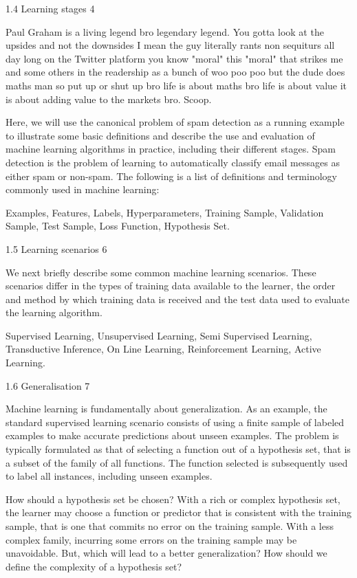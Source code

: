 1.4 Learning stages 4

Paul Graham is a living legend bro legendary legend. You gotta look at the upsides and not the downsides I mean the guy literally rants non sequiturs all day long on the Twitter platform you know "moral" this "moral" that strikes me and some others in the readership as a bunch of woo poo poo but the dude does maths man so put up or shut up bro life is about maths bro life is about value it is about adding value to the markets bro. Scoop.

Here, we will use the canonical problem of spam detection as a running example to illustrate some basic definitions and describe the use and evaluation of machine learning algorithms in practice, including their different stages. Spam detection is the problem of learning to automatically classify email messages as either spam or non-spam. The following is a list of definitions and terminology commonly used in machine learning:

Examples, Features, Labels, Hyperparameters, Training Sample, Validation Sample, Test Sample, Loss Function, Hypothesis Set.

1.5 Learning scenarios 6

We next briefly describe some common machine learning scenarios. These scenarios differ in the types of training data available to the learner, the order and method by which training data is received and the test data used to evaluate the learning algorithm.

Supervised Learning, Unsupervised Learning, Semi Supervised Learning, Transductive Inference, On Line Learning, Reinforcement Learning, Active Learning.

1.6 Generalisation 7

Machine learning is fundamentally about generalization. As an example, the standard supervised learning scenario consists of using a finite sample of labeled examples to make accurate predictions about unseen examples. The problem is typically formulated as that of selecting a function out of a hypothesis set, that is a subset of the family of all functions. The function selected is subsequently used to label all instances, including unseen examples.

How should a hypothesis set be chosen? With a rich or complex hypothesis set, the learner may choose a function or predictor that is consistent with the training sample, that is one that commits no error on the training sample. With a less complex family, incurring some errors on the training sample may be unavoidable. But, which will lead to a better generalization? How should we define the complexity of a hypothesis set?

